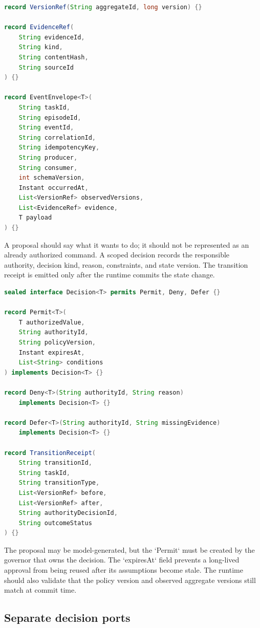 \begin{lstlisting}[language=Java,caption={A common event envelope and version reference}]
record VersionRef(String aggregateId, long version) {}

record EvidenceRef(
    String evidenceId,
    String kind,
    String contentHash,
    String sourceId
) {}

record EventEnvelope<T>(
    String taskId,
    String episodeId,
    String eventId,
    String correlationId,
    String idempotencyKey,
    String producer,
    String consumer,
    int schemaVersion,
    Instant occurredAt,
    List<VersionRef> observedVersions,
    List<EvidenceRef> evidence,
    T payload
) {}
\end{lstlisting}

A proposal should say what it wants to do; it should not be represented as an already authorized command. A scoped decision records the responsible authority, decision kind, reason, constraints, and state version. The transition receipt is emitted only after the runtime commits the state change.

\begin{lstlisting}[language=Java,caption={Proposal, scoped governor decision, and committed receipt}]
sealed interface Decision<T> permits Permit, Deny, Defer {}

record Permit<T>(
    T authorizedValue,
    String authorityId,
    String policyVersion,
    Instant expiresAt,
    List<String> conditions
) implements Decision<T> {}

record Deny<T>(String authorityId, String reason)
    implements Decision<T> {}

record Defer<T>(String authorityId, String missingEvidence)
    implements Decision<T> {}

record TransitionReceipt(
    String transitionId,
    String taskId,
    String transitionType,
    List<VersionRef> before,
    List<VersionRef> after,
    String authorityDecisionId,
    String outcomeStatus
) {}
\end{lstlisting}

The proposal may be model-generated, but the `Permit` must be created by the governor that owns the decision. The `expiresAt` field prevents a long-lived approval from being reused after its assumptions become stale. The runtime should also validate that the policy version and observed aggregate versions still match at commit time.

\subsection{Separate decision ports}
\label{subsec:ch18-separate-decision-ports}

